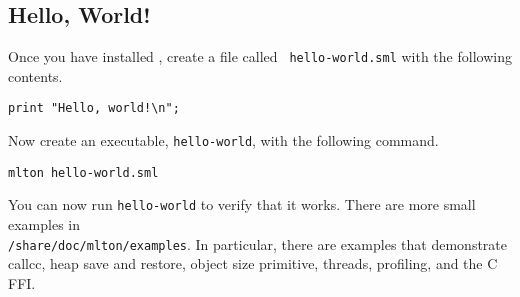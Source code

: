 \subsection{Hello, World!}

Once you have installed {\mlton}, create a file called {\tt
hello-world.sml} with the following contents.

\begin{verbatim}
print "Hello, world!\n";
\end{verbatim}
Now create an executable, {\tt hello-world}, with the following command.
\begin{verbatim}
mlton hello-world.sml
\end{verbatim}
You can now run {\tt hello-world} to verify that it works.  There are
more small examples in\\ {\tt \prefix/share/doc/mlton/examples}.  In
particular, there are examples that demonstrate callcc, heap save and
restore, object size primitive, threads, profiling, and the C FFI.
